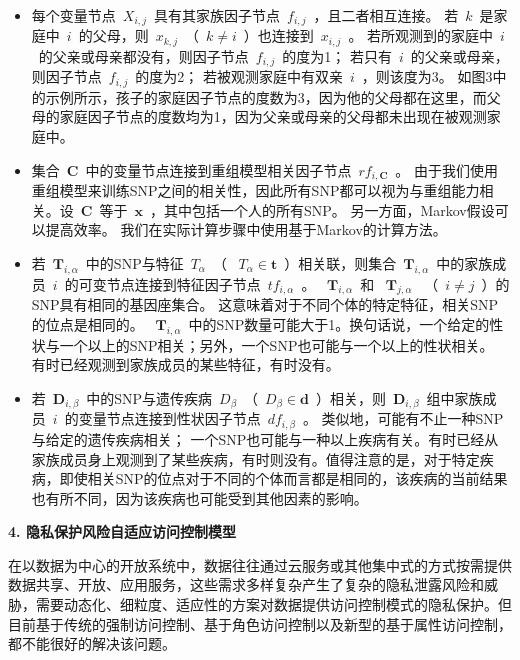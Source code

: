 \documentclass[pdftex,notypeinfo,twoside,openany,UTF8,fntef]{CASthesis}
\theoremstyle{THrm}{
	\newtheorem{question}{Question}[section]
	\newtheorem{property}{性质}[section]
	\newtheorem{assumption}{假设}[section]
	\newtheorem{claim}[lemma]{断言}
	
}
\begin{document}
\begin{itemize}
	\item 每个变量节点~$X_{i,j}$~具有其家族因子节点~$f_{i,j}$~，且二者相互连接。 若~$k$~是家庭中~$i$~的父母，则~$x_{k,j}$~（~$k \neq i$~）也连接到~$x_{i,j}$~。 若所观测到的家庭中~$i$~的父亲或母亲都没有，则因子节点~$f_{i,j}$~的度为1； 若只有~$i$~的父亲或母亲，则因子节点~$f_{i,j}$~的度为2； 若被观测家庭中有双亲~$i$~，则该度为3。 如图3中的示例所示，孩子的家庭因子节点的度数为3，因为他的父母都在这里，而父母的家庭因子节点的度数均为1，因为父亲或母亲的父母都未出现在被观测家庭中。
	\item 集合~$\mathbf{C}$~中的变量节点连接到重组模型相关因子节点~$rf_{i,\mathbf{C}}$~。 由于我们使用重组模型来训练SNP之间的相关性，因此所有SNP都可以视为与重组能力相关。设~$\mathbf{C}$~等于~$\mathbf{x}$~，其中包括一个人的所有SNP。 另一方面，Markov假设可以提高效率。 我们在实际计算步骤中使用基于Markov的计算方法。
	\item 若~$\mathbf{T}_{i,\alpha}$~中的SNP与特征~$T_{\alpha}$~（ ~$T_{\alpha} \in \mathbf{t}$~）相关联，则集合~$\mathbf{T}_{i,\alpha}$~中的家族成员~$i$~的可变节点连接到特征因子节点~$tf_{i,\alpha}$~。 ~$\mathbf{T}_{i,\alpha}$~和 ~$\mathbf{T}_{j,\alpha}$~ （~$i \neq j$~）的SNP具有相同的基因座集合。 这意味着对于不同个体的特定特征，相关SNP的位点是相同的。 ~$\mathbf{T}_{i,\alpha}$~中的SNP数量可能大于1。换句话说，一个给定的性状与一个以上的SNP相关；另外，一个SNP也可能与一个以上的性状相关。 有时已经观测到家族成员的某些特征，有时没有。
	\item 若~$\mathbf{D}_{i,\beta}$~中的SNP与遗传疾病~$D_{\beta}$~（~$D_{\beta} \in \mathbf{d}$~）相关，则~$\mathbf{D}_{i,\beta}$~组中家族成员~$i$~的变量节点连接到性状因子节点~$df_{i,\beta}$~。 类似地，可能有不止一种SNP与给定的遗传疾病相关； 一个SNP也可能与一种以上疾病有关。有时已经从家族成员身上观测到了某些疾病，有时则没有。值得注意的是，对于特定疾病，即使相关SNP的位点对于不同的个体而言都是相同的，该疾病的当前结果也有所不同，因为该疾病也可能受到其他因素的影响。
	
\end{itemize}


\textbf{4.	隐私保护风险自适应访问控制模型}

在以数据为中心的开放系统中，数据往往通过云服务或其他集中式的方式按需提供数据共享、开放、应用服务，这些需求多样复杂产生了复杂的隐私泄露风险和威胁，需要动态化、细粒度、适应性的方案对数据提供访问控制模式的隐私保护。但目前基于传统的强制访问控制、基于角色访问控制以及新型的基于属性访问控制，都不能很好的解决该问题。
\end{document}
